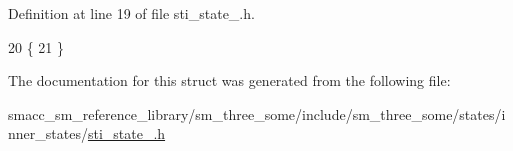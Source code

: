 Definition at line 19 of file sti\+\_\+state\+\_.\+h.


\begin{DoxyCode}
20   \{
21   \}
\end{DoxyCode}


The documentation for this struct was generated from the following file\+:\begin{DoxyCompactItemize}
\item 
smacc\+\_\+sm\+\_\+reference\+\_\+library/sm\+\_\+three\+\_\+some/include/sm\+\_\+three\+\_\+some/states/inner\+\_\+states/\hyperlink{sm__three__some_2include_2sm__three__some_2states_2inner__states_2sti__state__1_8h}{sti\+\_\+state\+\_.\+h}\end{DoxyCompactItemize}
